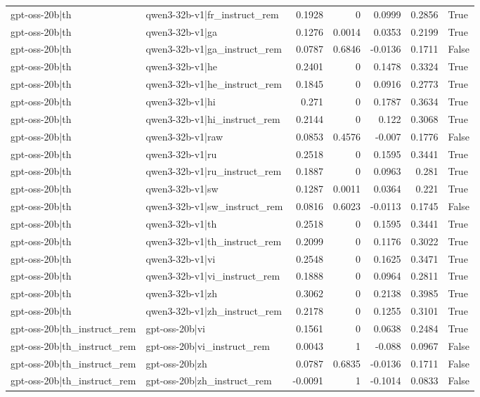 \begin{table}
\begin{tabular}{l l r r r r l}
gpt-oss-20b|th & qwen3-32b-v1|fr_instruct_rem & 0.1928 & 0 & 0.0999 & 0.2856 & True \\
gpt-oss-20b|th & qwen3-32b-v1|ga & 0.1276 & 0.0014 & 0.0353 & 0.2199 & True \\
gpt-oss-20b|th & qwen3-32b-v1|ga_instruct_rem & 0.0787 & 0.6846 & -0.0136 & 0.1711 & False \\
gpt-oss-20b|th & qwen3-32b-v1|he & 0.2401 & 0 & 0.1478 & 0.3324 & True \\
gpt-oss-20b|th & qwen3-32b-v1|he_instruct_rem & 0.1845 & 0 & 0.0916 & 0.2773 & True \\
gpt-oss-20b|th & qwen3-32b-v1|hi & 0.271 & 0 & 0.1787 & 0.3634 & True \\
gpt-oss-20b|th & qwen3-32b-v1|hi_instruct_rem & 0.2144 & 0 & 0.122 & 0.3068 & True \\
gpt-oss-20b|th & qwen3-32b-v1|raw & 0.0853 & 0.4576 & -0.007 & 0.1776 & False \\
gpt-oss-20b|th & qwen3-32b-v1|ru & 0.2518 & 0 & 0.1595 & 0.3441 & True \\
gpt-oss-20b|th & qwen3-32b-v1|ru_instruct_rem & 0.1887 & 0 & 0.0963 & 0.281 & True \\
gpt-oss-20b|th & qwen3-32b-v1|sw & 0.1287 & 0.0011 & 0.0364 & 0.221 & True \\
gpt-oss-20b|th & qwen3-32b-v1|sw_instruct_rem & 0.0816 & 0.6023 & -0.0113 & 0.1745 & False \\
gpt-oss-20b|th & qwen3-32b-v1|th & 0.2518 & 0 & 0.1595 & 0.3441 & True \\
gpt-oss-20b|th & qwen3-32b-v1|th_instruct_rem & 0.2099 & 0 & 0.1176 & 0.3022 & True \\
gpt-oss-20b|th & qwen3-32b-v1|vi & 0.2548 & 0 & 0.1625 & 0.3471 & True \\
gpt-oss-20b|th & qwen3-32b-v1|vi_instruct_rem & 0.1888 & 0 & 0.0964 & 0.2811 & True \\
gpt-oss-20b|th & qwen3-32b-v1|zh & 0.3062 & 0 & 0.2138 & 0.3985 & True \\
gpt-oss-20b|th & qwen3-32b-v1|zh_instruct_rem & 0.2178 & 0 & 0.1255 & 0.3101 & True \\
gpt-oss-20b|th_instruct_rem & gpt-oss-20b|vi & 0.1561 & 0 & 0.0638 & 0.2484 & True \\
gpt-oss-20b|th_instruct_rem & gpt-oss-20b|vi_instruct_rem & 0.0043 & 1 & -0.088 & 0.0967 & False \\
gpt-oss-20b|th_instruct_rem & gpt-oss-20b|zh & 0.0787 & 0.6835 & -0.0136 & 0.1711 & False \\
gpt-oss-20b|th_instruct_rem & gpt-oss-20b|zh_instruct_rem & -0.0091 & 1 & -0.1014 & 0.0833 & False \\

\end{tabular}
\end{table}
